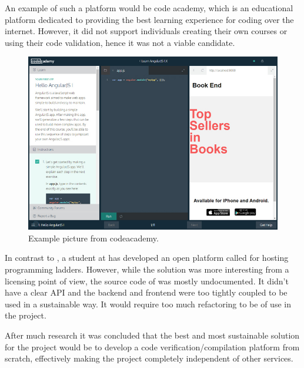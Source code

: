 An example of such a platform would be code academy, which is an educational platform dedicated to providing the best learning experience for coding over the internet. However, it did not support individuals creating their own courses or using their code validation, hence it was not a viable candidate.
\begin{figure}[h]
   \centering
    \includegraphics[width=.75\linewidth]{img/codeacademy_code.jpg}
    \caption{Example picture from codeacademy.}
\end{figure}


In contrast to \techio{}, a student at \LTU{} has developed an open platform called \sockr{} for hosting programming ladders. However, while the solution was more interesting from a licensing point of view, the source code of \sockr{} was mostly undocumented. It didn't have a clear API and the backend and frontend were too tightly coupled to be used in a sustainable way. It would require too much refactoring to be of use in the project.

After much research it was concluded that the best and most sustainable solution for the project would be to develop a code verification/compilation platform from scratch, effectively making the project completely independent of other services.
